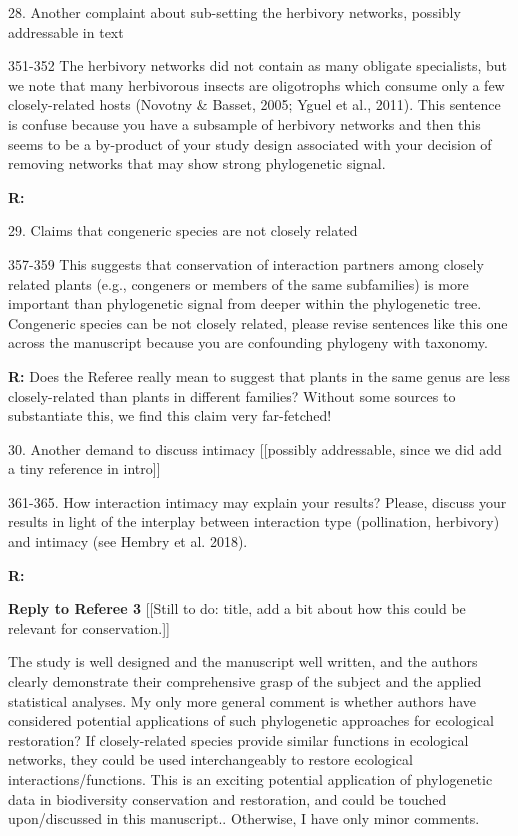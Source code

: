 \documentclass[12pt]{letter}
\newenvironment{refquote}{\bigskip \begin{it}}{\end{it}\smallskip}
\begin{document}
	28. Another complaint about sub-setting the herbivory networks, possibly addressable in text

		\begin{refquote}
			351-352 The herbivory networks did not contain as many obligate specialists, but we note that many herbivorous insects are oligotrophs which consume only a few closely-related hosts (Novotny & Basset, 2005; Yguel et al., 2011). This sentence is confuse because you have a subsample of herbivory networks and then this seems to be a by-product of your study design associated with your decision of removing networks that may show strong phylogenetic signal.
		\end{refquote}

		\textbf{R:} 


	29. Claims that congeneric species are not closely related

		\begin{refquote}
			357-359 This suggests that conservation of interaction partners among closely related plants (e.g., congeners or members of the same subfamilies) is more important than phylogenetic signal from deeper within the phylogenetic tree. Congeneric species can be not closely related, please revise sentences like this one across the manuscript because you are confounding phylogeny with taxonomy.
		\end{refquote}


		\textbf{R:} Does the Referee really mean to suggest that plants in the same genus are less closely-related than plants in different families? Without some sources to substantiate this, we find this claim very far-fetched!


	30. Another demand to discuss intimacy [[possibly addressable, since we did add a tiny reference in intro]]

		\begin{refquote}
			361-365. How interaction intimacy may explain your results? Please, discuss your results in light of the interplay between interaction type (pollination, herbivory) and intimacy (see Hembry et al. 2018).
		\end{refquote}


		\textbf{R:}


\clearpage

{\Large \bf Reply to Referee 3} [[Still to do: title, add a bit about how this could be relevant for conservation.]]

	\begin{refquote}
		The study is well designed and the manuscript well written, and the authors clearly demonstrate their comprehensive grasp of the subject and the applied statistical analyses.
		My only more general comment is whether authors have considered potential applications of such phylogenetic approaches for ecological restoration? If closely-related species provide similar functions in ecological networks, they could be used interchangeably to restore ecological interactions/functions. This is an exciting potential application of phylogenetic data in biodiversity conservation and restoration, and could be touched upon/discussed in this manuscript.. 
		Otherwise, I have only minor comments.
	\end{refquote}
\end{document}
